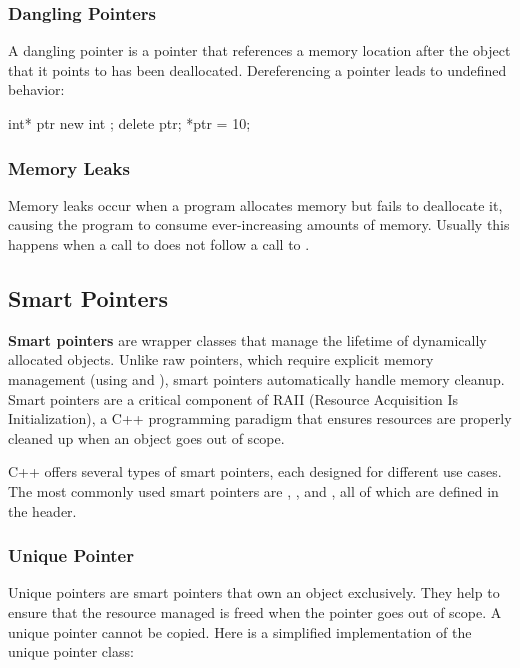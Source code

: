 \documentclass[12pt]{article}
\begin{document}
\subsubsection{Dangling Pointers}

\noindent
A dangling pointer is a pointer that references a memory location after the object that it points to has been deallocated.
Dereferencing a pointer leads to undefined behavior:

\begin{cxx}{}
int* ptr { new int };
delete ptr;
*ptr = 10;
\end{cxx}

\subsubsection{Memory Leaks}

\noindent
Memory leaks occur when a program allocates memory but fails to deallocate it, causing the program to consume ever-increasing amounts of memory.
Usually this happens when a call to  does not follow a call to .

\subsection{Smart Pointers}

\noindent
\textbf{Smart pointers} are wrapper classes that manage the lifetime of dynamically allocated objects.
Unlike raw pointers, which require explicit memory management (using  and ), smart pointers automatically handle memory cleanup.
Smart pointers are a critical component of RAII (Resource Acquisition Is Initialization), a C++ programming paradigm that ensures resources are properly cleaned up when an object goes out of scope.

\vspace{1em}
\noindent
C++ offers several types of smart pointers, each designed for different use cases.
The most commonly used smart pointers are , , and , all of which are defined in the  header.

\subsubsection{Unique Pointer}

\noindent
Unique pointers are smart pointers that own an object exclusively.
They help to ensure that the resource managed is freed when the pointer goes out of scope.
A unique pointer cannot be copied.
Here is a simplified implementation of the unique pointer class:
\end{document}
